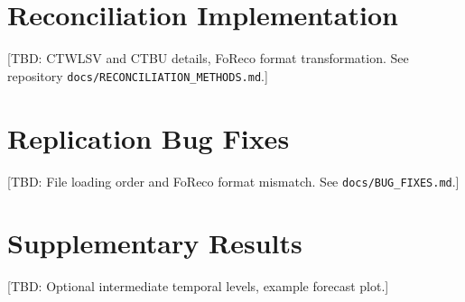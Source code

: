 \begin{appendices}

\section{Reconciliation Implementation}\label{app:reconciliation}

[TBD: CTWLSV and CTBU details, FoReco format transformation. See repository \texttt{docs/RECONCILIATION\_METHODS.md}.]

\section{Replication Bug Fixes}\label{app:bug-fixes}

[TBD: File loading order and FoReco format mismatch. See \texttt{docs/BUG\_FIXES.md}.]

\section{Supplementary Results}\label{app:supplementary}

[TBD: Optional intermediate temporal levels, example forecast plot.]

\end{appendices}
